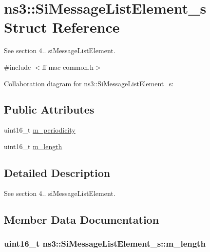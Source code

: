 \hypertarget{structns3_1_1SiMessageListElement__s}{}\section{ns3\+:\+:Si\+Message\+List\+Element\+\_\+s Struct Reference}
\label{structns3_1_1SiMessageListElement__s}


See section 4.. si\+Message\+List\+Element.  




{\ttfamily \#include $<$ff-\/mac-\/common.\+h$>$}



Collaboration diagram for ns3\+:\+:Si\+Message\+List\+Element\+\_\+s\+:
\subsection*{Public Attributes}
\begin{DoxyCompactItemize}
\item 
uint16\+\_\+t \hyperlink{structns3_1_1SiMessageListElement__s_afe1fa2e77d9f3400eeac85fc7f23c0f2}{m\+\_\+periodicity}
\item 
uint16\+\_\+t \hyperlink{structns3_1_1SiMessageListElement__s_abe7a3d77384612508eb4e892c6a69dce}{m\+\_\+length}
\end{DoxyCompactItemize}


\subsection{Detailed Description}
See section 4.. si\+Message\+List\+Element. 

\subsection{Member Data Documentation}
\subsubsection[{\texorpdfstring{m\+\_\+length}{m_length}}]{\setlength{\rightskip}{0pt plus 5cm}uint16\+\_\+t ns3\+::\+Si\+Message\+List\+Element\+\_\+s\+::m\+\_\+length}\hypertarget{structns3_1_1SiMessageListElement__s_abe7a3d77384612508eb4e892c6a69dce}{}\label{structns3_1_1SiMessageListElement__s_abe7a3d77384612508eb4e892c6a69dce}
